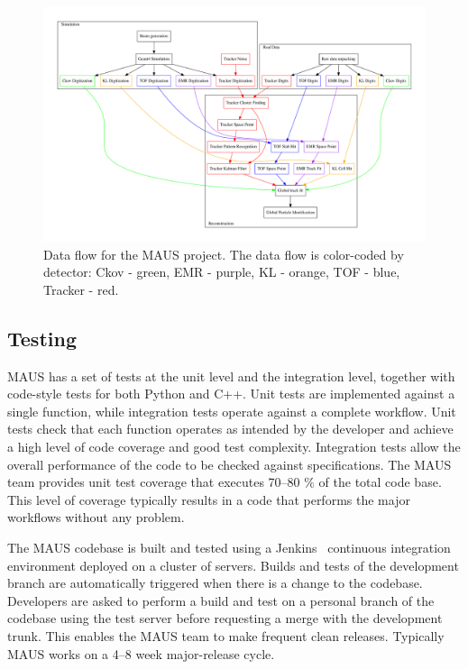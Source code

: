\documentclass{JINST}
\begin{document}
\begin{figure}[htbp]
  \centering
  \includegraphics[width=1.0\textwidth]{figs/maus_process_diagram.pdf}
  \caption{Data flow for the MAUS project. The data flow is color-coded by detector: Ckov - green, EMR - purple, KL - orange, TOF - blue, Tracker - red. }
  \label{fig:maus_process_diagram}
\end{figure}

\subsection{Testing}\label{sec:maus-tests}
MAUS has a set of tests at the unit level and the integration level, together with code-style tests for both Python and C++. Unit tests are implemented against a single function, while integration tests operate against a complete workflow. Unit tests check that each function operates as intended by the developer and achieve a high level of code coverage and good test complexity. Integration tests allow the overall performance of the code to be checked against specifications. The MAUS team provides unit test coverage that executes 70--80 $\%$ of the total code base. This level of coverage typically results in a code that performs the major workflows without any problem.
%

The MAUS codebase is built and tested using a Jenkins~\cite{Jenkins} continuous integration environment deployed on a cluster of servers. Builds and tests of the development branch are automatically triggered when there is a change to the codebase.  Developers are asked to perform a build and test on a personal branch of the codebase using the test server before requesting a merge with the development trunk. This enables the MAUS team to make frequent clean releases. Typically MAUS works on a 4--8 week major-release cycle.
\end{document}
